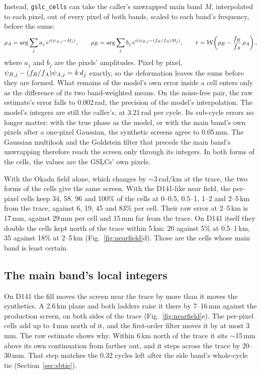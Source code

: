 Instead, \texttt{gslc\_cells} can take the caller's unwrapped main band $M$, interpolated to each pixel, out of every
pixel of both bands, scaled to each band's frequency, before the sums:
\begin{equation}
  \rho_A = \arg \sum_j a_j\, e^{i(\psi_{A,j} - M_j)}, \qquad
  \rho_B = \arg \sum_j b_j\, e^{i(\psi_{B,j} - (f_B/f_A) M_j)}, \qquad
  r = \mathcal{W}\!\left(\rho_B - \frac{f_B}{f_A}\,\rho_A\right),
  \label{eq:pixel}
\end{equation}
where $a_j$ and $b_j$ are the pixels' amplitudes. Pixel by pixel, $\psi_{B,j} - (f_B/f_A)\psi_{A,j} = k\,d_j$ exactly,
so the deformation leaves the sums before they are formed. What remains of the model's own error inside a cell enters
only as the difference of its two band-weighted means. On the noise-free pair, the raw estimate's error falls to
0.002\,rad, the precision of the model's interpolation. The model's integers are still the caller's, at 3.21\,rad per
cycle. Its sub-cycle errors no longer matter: with the true phase as the model, or with the main band's own pixels
after a one-pixel Gaussian, the synthetic screens agree to 0.05\,mm. The Gaussian multilook and the Goldstein filter
that precede the main band's unwrapping therefore reach the screen only through its integers. In both forms of the
cells, the values are the GSLCs' own pixels.

With the Okada field alone, which changes by $\sim$3\,rad/km at the trace, the two forms of the cells give the same
screen. With the D141-like near field, the per-pixel cells keep 34, 58, 96 and 100\% of the cells at 0--0.5, 0.5--1,
1--2 and 2--5\,km from the trace, against 6, 19, 45 and 83\% per cell. Their raw error at 2--5\,km is 17\,mm, against
29\,mm per cell and 15\,mm far from the trace. On D141 itself they double the cells kept north of the trace within
5\,km: 20 against 5\% at 0.5--1\,km, 35 against 18\% at 2--5\,km (Fig.~\ref{fig:nearfield}d). Those are the cells whose
main band is least certain.

\subsection{The main band's local integers}
\label{sec:integers}
On D141 the fill moves the screen near the trace by more than it moves the synthetics. A 2.6\,km plane and both
ladders raise it there by 7--16\,mm against the production screen, on both sides of the trace
(Fig.~\ref{fig:nearfield}e). The per-pixel cells add up to 4\,mm north of it, and the first-order filter moves it by
at most 3\,mm. The raw estimate shows why. Within 6\,km north of the trace it sits $\sim$15\,mm
above its own continuation from farther out, and it steps across the trace by 20--30\,mm. That step matches the 0.32
cycles left after the side band's whole-cycle tie (Section~\ref{sec:sbtie}).

